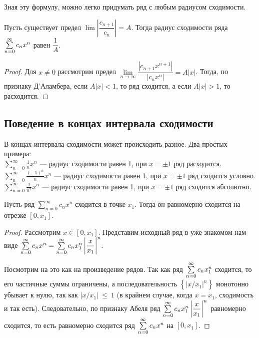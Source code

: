 \documentclass[a4paper, 12pt]{article}
\begin{document}
Зная эту формулу, можно легко придумать ряд с любым радиусом сходимости.

\begin{Statement}
Пусть существует предел $\lim \left|\dfrac{c_{n+1}}{c_n}  \right| = A$. Тогда радиус сходимости ряда $\sum\limits_{n=0}^{\infty} c_nx^n$ равен $\dfrac{1}{A}$.
\end{Statement}

\begin{proof}
Для $x \neq 0$ рассмотрим предел $\lim\limits_{n \to \infty} \dfrac{|c_{n+1}x^{n+1}|}{|c_nx^n|} = A|x|$. Тогда, по признаку Д'Аламбера, если $A|x| < 1$, то ряд сходится, а если $A|x| > 1$, то расходится.
\end{proof}

\subsection{Поведение в концах интервала сходимости}

В концах интервала сходимости может происходить разное.
Два простых примера:
\\$\sum\limits_{n = 0}^{\infty}\frac{1}{n} x^n$ --- радиус сходимости равен 1, при $x= \pm 1$ ряд расходится.
\\$\sum\limits_{n = 0}^{\infty}\frac{(-1)^n}{n} x^n$ --- радиус сходимости равен 1, при $x= \pm 1$ ряд сходится условно.
\\$\sum\limits_{n = 0}^{\infty}\frac{1}{n^2} x^n$ --- радиус сходимости равен 1, при $x= \pm 1$ ряд сходится абсолютно.




\begin{Theorem} [Абеля II]
	Пусть ряд $\sum\limits_{n = 0}^{\infty}c_n x^n$ сходится в точке $x_1$. Тогда он равномерно сходится на отрезке $[0, x_1]$.
\end{Theorem}

\begin{proof}
Рассмотрим $x \in [0, x_1]$. Представим исходный ряд в уже знакомом нам виде $\sum\limits_{n=0}^{\infty} c_n x^n = \sum\limits_{n=0}^{\infty} c_n x_1^n \left|\dfrac{x}{x_1} \right|^n$.

Посмотрим на это как на произведение рядов. Так как ряд $\sum\limits_{n=0}^{\infty} c_nx_1^n$ сходится, то его частичные суммы ограничены, а последовательность $\left\{\left|x/x_1\right|^n \right\}$ монотонно убывает к нулю, так как $|x/x_1|~\leq~1$ (в крайнем случае, когда $x=x_1$, сходимость и так есть). Следовательно, по признаку Абеля ряд $\sum\limits_{n=0}^{\infty} c_n x_1^n \left|\dfrac{x}{x_1} \right|^n$ равномерно сходится, то есть равномерно сходится ряд $\sum\limits_{n=0}^{\infty} c_nx^n$ на $[0, x_1]$.
\end{proof}
\end{document}
